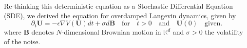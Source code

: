 \documentclass{article}
\begin{document}
\smallskip\noindent
Re-thinking this deterministic equation as a Stochastic Differential Equation (SDE), we derived the equation for overdamped Langevin dynamics, given by
\begin{equation}
\partial_t \textbf{U} = -\epsilon\nabla V (\textbf{U})dt  + \sigma d\textbf{B} \quad \mbox{for} \quad t > 0 \quad \mbox{and} \quad \textbf{U}(0) \quad \mbox{given}.
\end{equation}
where $\textbf{B}$ denotes $N$-dimensional Brownian motion in $\mathbb R^d$ and $\sigma > 0$ the volatility of the noise.
 
\end{document}
